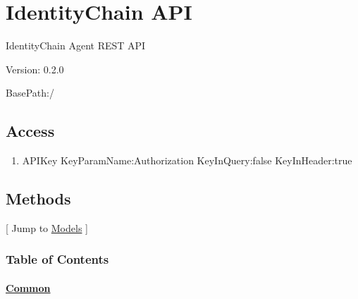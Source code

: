 \hypertarget{identitychain-api}{%
\section{IdentityChain API}\label{identitychain-api}}

IdentityChain Agent REST API

Version: 0.2.0

BasePath:/

\hypertarget{access}{%
\subsection{Access}\label{access}}

\begin{enumerate}
\tightlist
\item
  APIKey KeyParamName:Authorization KeyInQuery:false KeyInHeader:true
\end{enumerate}

\hypertarget{methods}{%
\subsection{\texorpdfstring{\protect\hypertarget{__Methods}{}{Methods}}{Methods}}\label{methods}}

{[} Jump to \protect\hyperlink{__Models}{Models} {]}

\hypertarget{table-of-contents}{%
\subsubsection{Table of Contents}\label{table-of-contents}}

\hypertarget{common}{%
\paragraph{\texorpdfstring{\protect\hyperlink{Common}{Common}}{Common}}\label{common}}

